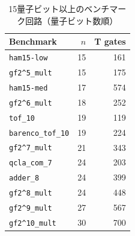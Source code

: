 \begin{table}[t]
  \centering
  \caption{15量子ビット以上のベンチマーク回路（量子ビット数順）}
  \label{tab:benchmark-circuits-n15-by-qubits}
  \small
  \setlength{\tabcolsep}{5pt}
  \renewcommand{\arraystretch}{1.12}
  \begin{tabular}{lrr}
    \toprule
    Benchmark & $n$ & T gates \\
    \midrule
    \texttt{ham15-low}                     & 15 & 161 \\
    \texttt{gf2\textasciicircum5\_mult}   & 15 & 175 \\
    \texttt{ham15-med}                     & 17 & 574 \\
    \texttt{gf2\textasciicircum6\_mult}   & 18 & 252 \\
    \texttt{tof\_10}                       & 19 & 119 \\
    \texttt{barenco\_tof\_10}             & 19 & 224 \\
    \texttt{gf2\textasciicircum7\_mult}   & 21 & 343 \\
    \texttt{qcla\_com\_7}                 & 24 & 203 \\
    \texttt{adder\_8}                      & 24 & 399 \\
    \texttt{gf2\textasciicircum8\_mult}   & 24 & 448 \\
    \texttt{gf2\textasciicircum9\_mult}   & 27 & 567 \\
    \texttt{gf2\textasciicircum10\_mult}  & 30 & 700 \\
    \bottomrule
  \end{tabular}
\end{table}
